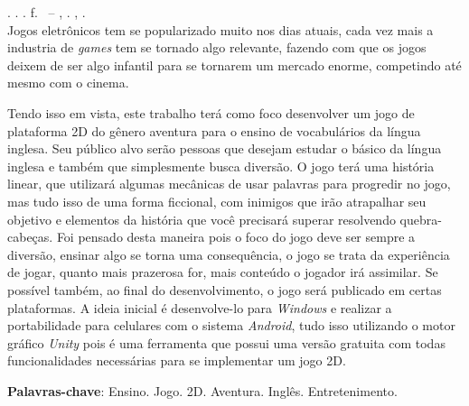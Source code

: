 
\begin{resumo}[RESUMO]
\begin{SingleSpacing}

\imprimirautorcitacao. \imprimirtitulo. \imprimirdata. \pageref {LastPage} f. \imprimirprojeto\ – \imprimirprograma, \imprimirinstituicao. \imprimirlocal, \imprimirdata.\\

Jogos eletrônicos tem se popularizado muito nos dias atuais, cada vez mais a industria de \textit{games} tem se tornado algo relevante, fazendo com que os jogos deixem de ser algo infantil para se tornarem um mercado enorme, competindo até mesmo com o cinema.

Tendo isso em vista, este trabalho terá como foco desenvolver um jogo de plataforma 2D do gênero aventura para o ensino de vocabulários da língua inglesa. Seu público alvo serão pessoas que desejam estudar o básico da língua inglesa e também que simplesmente busca diversão. O jogo terá uma história linear, que utilizará algumas mecânicas de usar palavras para progredir no jogo, mas tudo isso de uma forma ficcional, com inimigos que irão atrapalhar seu objetivo e elementos da história que você precisará superar resolvendo quebra-cabeças. Foi pensado desta maneira pois o foco do jogo deve ser sempre a diversão, ensinar algo se torna uma consequência, o jogo se trata da experiência de jogar, quanto mais prazerosa for, mais conteúdo o jogador irá assimilar. Se possível também, ao final do desenvolvimento, o jogo será publicado em certas plataformas. A ideia inicial é desenvolve-lo para \textit{Windows} e realizar a portabilidade para celulares com o sistema \textit{Android}, tudo isso utilizando o motor gráfico \textit{Unity} pois é uma ferramenta que possui uma versão gratuita com todas funcionalidades necessárias para se implementar um jogo 2D.


\textbf{Palavras-chave}: Ensino. Jogo. 2D. Aventura. Inglês. Entretenimento.

\end{SingleSpacing}
\end{resumo}

